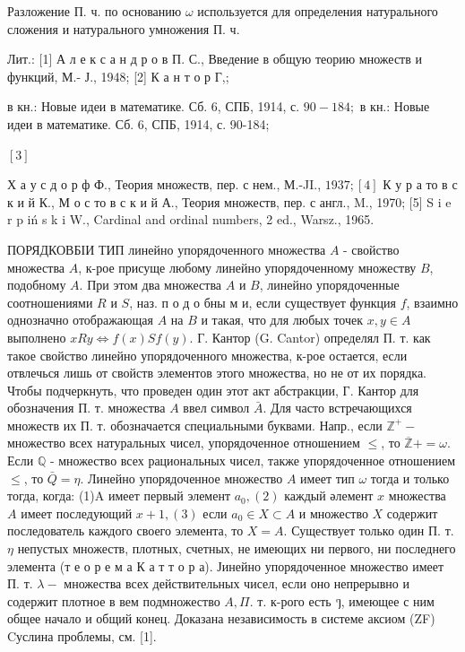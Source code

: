 \documentclass[10pt]{article}
\begin{document}
Разложение П. ч. по основанию $\omega$ используется для определения натурального сложения и натурального умножения П. ч.



Лит.: [1] А л е к с а н д р о в П. С., Введение в общую теорию множеств и функций, М.- Ј., 1948; [2] К а н т о р Г,;

в кн.: Новые идеи в математике. Сб. 6, СПБ, 1914, с. $90-184 ;$ в кн.: Новые идеи в математике. Сб. 6, СПБ, 1914, с. 90-184;

$[3]$

Х а у с д о р ф Ф., Теория множеств, пер. с нем., М.-JI., $1937 ;[4]$ К у р а то в с к и й К., М о с то в с к и й А., Теория множеств, пер. с англ., M., 1970; [5] S i e r p iń s k i W., Cardinal and ordinal numbers, 2 ed., Warsz., 1965.



ПОРЯДКОВБІИ ТИП линейно упорядоченного множества $A$ - свойство множества $A$, к-рое присуще любому линейно упорядоченному множеству $B$, подобному $A$. При этом два множества $A$ и $B$, линейно упорядоченные соотношениями $R$ и $S$, наз. п о д о бны м и, если существует функция $f$, взаимно однозначно отображающая $A$ на $B$ и такая, что для любых точек $x, y \in A$ выполнено $x R y \Longleftrightarrow f(x) S f(y)$. Г. Кантор (G. Cantor) определял П. т. как такое свойство линейно упорядоченного множества, к-рое остается, если отвлечься лишь от свойств элементов этого множества, но не от их порядка. Чтобы подчеркнуть, что проведен один этот акт абстракции, Г. Кантор для обозначения П. т. множества $A$ ввел символ $\bar{A}$. Для часто встречающихся множеств их П. т. обозначается специальными буквами. Напр., если $\mathbb{Z}^{+}-$множество всех натуральных чисел, упорядоченное отношением $\leqslant$, то $\overline{\mathbb{Z}}+=\omega$. Если $\mathbb{Q}$ - множество всех рациональных чисел, также упорядоченное отношением $\leqslant$, то $\bar{Q}=\eta$. Линейно упорядоченное множество $A$ имеет тип $\omega$ тогда и только тогда, когда: (1)A имеет первый элемент $a_{0},(2)$ каждый әлемент $x$ множества $A$ имеет последующий $x+1,(3)$ если $a_{0} \in X \subset A$ и множество $X$ содержит последователь каждого своего элемента, то $X=A$. Существует только один П. т. $\eta$ непустых множеств, плотных, счетных, не имеющих ни первого, ни последнего элемента (т е о р е м а К а т т о р а). Јинейно упорядоченное множество имеет П. т. $\lambda-$ множества всех действительных чисел, если оно непрерывно и содержит плотное в вем подмножество $A, \Pi$. т. к-рого есть ๆ, имеющее с ним общее начало и общий конец. Доказана независимость в системе аксиом (ZF) Cуслина проблемы, см. [1].
\end{document}
